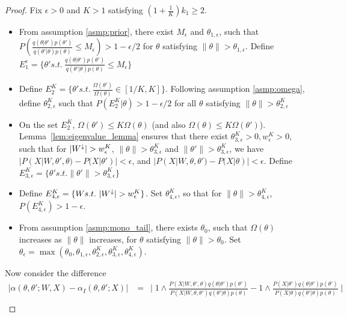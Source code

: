 \begin{proof}
  Fix $\epsilon > 0$ and $K > 1$ satisfying $(1 + \frac{1}{K})k_1 \ge 2$.
  \begin{itemize}
    \item  
From assumption \ref{asmp:prior}, there exist 
$M_\epsilon$ and $\theta_{1,\epsilon}$, such that 
$P(\frac{q(\theta | \theta')p(\theta')}{q(\theta' | \theta)p(\theta)}\leq M_\epsilon) > 1 - \epsilon / 2$ 
{for } $\theta$ satisfying $ \| \theta \| > \theta_{1,\epsilon}$.
    Define  $E_1^\epsilon = \{\theta' s.t.\ \frac{q(\theta | \theta')p(\theta')}{q(\theta' | \theta)p(\theta)}\leq M_\epsilon\}$
    \item Define $E^K_2 = \{\theta' s.t.\ \frac{\Omega(\theta')}{\Omega(\theta)}\in [1/K, K] \}$.
Following assumption \ref{asmp:omega}, define $\theta_{2, \epsilon}^K$ 
such that $P(E^K_2 | \theta) > 1 - \epsilon / 2$ for all $\theta$ satisfying $\| \theta \| > \theta_{2, \epsilon}^K$
    \item On the set $E^K_2$, $\Omega(\theta') \le K \Omega(\theta)$ (and also
$\Omega(\theta) \le K \Omega(\theta')$).  Lemma~\ref{lem:eigenvalue_lemma}
ensures that there exist $\theta_{3,\epsilon}^K > 0, w_\epsilon^K > 0$, 
such that for ${|W^\downarrow}| > w_\epsilon^K$, 
$ \| \theta \| > \theta_{3,\epsilon}^K$ and 
$ \| \theta' \| > \theta_{3,\epsilon}^K$, we have
$|P(X | W, \theta' , \theta) - P(X | \theta' )| < \epsilon$, and
$|P(X | W, \theta , \theta') - P(X | \theta )| < \epsilon$.
Define      $E_{3, \epsilon}^K = \{\theta' s.t. \| \theta'\| > {\theta}_{3,\epsilon}^K \}$ 
    \item Define $E_{4, \epsilon}^K =\{W s.t.\ \mW >  {w}_{\epsilon}^K\}$.
Set $\theta_{4,\epsilon}^K$, so that for $\| \theta \| > \theta_{4,\epsilon}^K$, 
$
P(E_{4,\epsilon}^K ) > 1 - \epsilon.
$
    \item From assumption \ref{asmp:mono_tail}, there exists $\theta_0$, such that $\Omega(\theta)$ increases as $\| \theta \|$ increases, for $\theta$ satisfying $\| \theta \| > \theta_0$.
Set ${\theta}_\epsilon =\max(\theta_0, \theta_{1, \epsilon},\theta_{2, \epsilon}^K,{\theta}_{3, \epsilon}^K, \theta_{4, \epsilon}^K)$. \\
  \end{itemize}
  Now consider the difference
\begin{align*}
|\alpha(\theta, \theta'; W, X) - \alpha_I(\theta, \theta'; X)| &= \ \mid 1 \wedge \frac{P(X | W, \theta' , \theta)q(\theta | \theta')p(\theta')}{P(X | W, \theta , \theta')q(\theta' | \theta)p(\theta)} - 1 \wedge \frac{P(X | \theta')q(\theta | \theta')p(\theta')}{P(X | \theta)q(\theta' | \theta)p(\theta)} \mid \\

\end{align*}
\end{proof}
